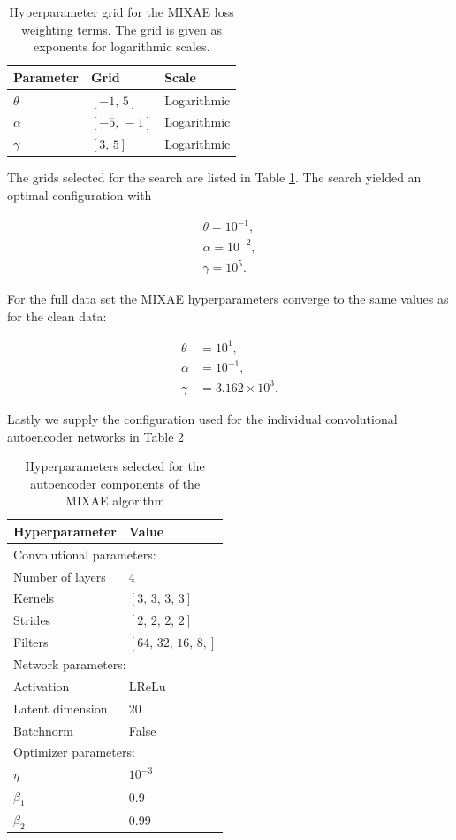 \documentclass[preprint,12pt]{elsarticle}
\begin{document}
\begin{table}
\centering
\caption{Hyperparameter grid for the MIXAE loss weighting terms. The grid is given as exponents for logarithmic scales.}\label{tab:mixae_loss_weights}
\begin{tabular}{lll}
\toprule
Parameter & Grid & Scale \\
\midrule 
$\theta$ & $[-1,\, 5]$ & Logarithmic \\
$\alpha$ & $[-5,\, -1]$ & Logarithmic \\
$\gamma$ & $[3,\, 5]$ & Logarithmic
\end{tabular}
\end{table}

The grids selected for the search are listed in Table \ref{tab:mixae_loss_weights}. The search yielded an optimal configuration with 

\begin{align}
\theta = 10^{-1}, \\
\alpha = 10^{-2}, \\
\gamma = 10^5.
\end{align}

For the full data set the MIXAE hyperparameters converge to the same values as for the clean data:

\begin{align}
\theta &= 10^{1}, \\
\alpha &= 10^{-1}, \\
\gamma &= 3.162\times 10^3.
\end{align}

Lastly we supply the configuration used for the individual convolutional autoencoder networks in Table \ref{tab:mixe_ae_hyperparams}

\begin{table}[H]
\renewcommand*{\arraystretch}{0.5}
\centering
\caption{Hyperparameters selected for the autoencoder components of the MIXAE algorithm}\label{tab:mixe_ae_hyperparams}
\setlength{\extrarowheight}{15pt}
\hspace*{-0.5in}
\begin{tabular}{ll}
\toprule
Hyperparameter & Value \\
\midrule
\multicolumn{2}{l}{Convolutional parameters: } \\
\midrule
Number of layers & $4$ \\
Kernels & $[3,\,3,\,3,\,3]$\\
Strides & $[2,\,2,\,2,\,2]$ \\
Filters & $[64,\, 32, \,16, \,8,]$ \\ 
\midrule
\multicolumn{2}{l}{Network parameters: } \\
\midrule
Activation & LReLu \\
Latent dimension & 20  \\
Batchnorm & False \\
\midrule
\multicolumn{2}{l}{Optimizer parameters: } \\
\midrule
$\eta$ & $10^{-3}$ \\
$\beta_1$ & $0.9$ \\
$\beta_2$ & $0.99$ \\
\bottomrule
\end{tabular}
\end{table}
\end{document}
